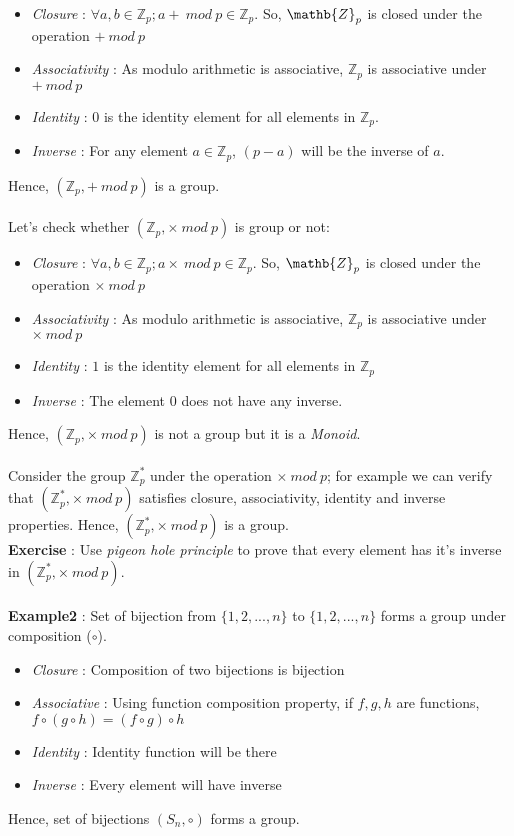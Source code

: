 \begin{itemize}
\item \emph{Closure} : $\forall a, b\in \mathbb{Z}_p; a+ \ mod \ p\in \mathbb{Z}_p$. So, $\mathb{Z}_p$ is closed under the operation $+ \ mod \ p$
\item \emph{Associativity} : As modulo arithmetic is associative, $\mathbb{Z}_p$ is associative under $+ \ mod \ p$
\item \emph{Identity} : $0$ is the identity element for all elements in $\mathbb{Z}_p$. 
\item \emph{Inverse} : For any element $a\in \mathbb{Z}_p$, $(p-a)$ will be the inverse of $a$.
\end{itemize}
Hence, $(\mathbb{Z}_p,+ \ mod \ p) $ is a group.
\paragraph{}
Let's check whether $(\mathbb{Z}_p,\times \ mod  \ p) $ is group or not:
\begin{itemize}
\item \emph{Closure} : $\forall a, b\in \mathbb{Z}_p; a\times \ mod \ p\in \mathbb{Z}_p$. So, $\mathb{Z}_p$ is closed under the operation $\times \ mod \ p$
\item \emph{Associativity} : As modulo arithmetic is associative, $\mathbb{Z}_p$ is associative under $\times \ mod \ p$
\item \emph{Identity} : $1$ is the identity element for all elements in $\mathbb{Z}_p$
\item \emph{Inverse} : The element $0$ does not have any inverse.
\end{itemize}
Hence, $(\mathbb{Z}_p,\times \ mod  \ p) $ is not a group but it is a \emph{Monoid}.
\paragraph{}
Consider the group $\mathbb{Z}_p^* $ under the operation $\times \ mod  \ p $; for example we can verify that $(\mathbb{Z}_p^*,\times \ mod  \ p) $ satisfies closure, associativity, identity and inverse properties. Hence, $(\mathbb{Z}_p^*,\times \ mod  \ p) $ is a group.\\
\textbf{Exercise} : Use \emph{pigeon hole principle} to prove that every element has it's inverse in  $(\mathbb{Z}_p^*,\times \ mod  \ p) $.
\paragraph{}
\textbf{Example2} : Set of bijection from $\{1,2,...,n\} $ to $\{1,2,...,n\}$ forms a group under composition ($\circ $).
\begin{itemize}
\item \emph{Closure} : Composition of two bijections is bijection
\item \emph{Associative} : Using function composition property, if $f,g,h$ are functions, $f\circ(g\circ h)=(f\circ g)\circ h$
\item \emph{Identity} : Identity function will be there
\item \emph{Inverse} : Every element will have inverse
\end{itemize}
Hence, set of bijections $(S_n,\circ) $ forms a group.
